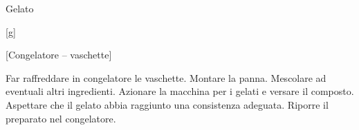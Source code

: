 \begin{recipe}[label=gelato]{Gelato}
    \begin{header}
        [g]

           [Congelatore -- vaschette]
    \end{header}

    \begin{ingredients}
        

    \end{ingredients}

    \begin{preparation}
        \step Far raffreddare in congelatore le vaschette.
        \step Montare la panna.
        \step Mescolare ad eventuali altri ingredienti.
        \step Azionare la macchina per i gelati e versare il composto.
        \step Aspettare che il gelato abbia raggiunto una consistenza adeguata.
        \step Riporre il preparato nel congelatore.
    \end{preparation}
\end{recipe}
